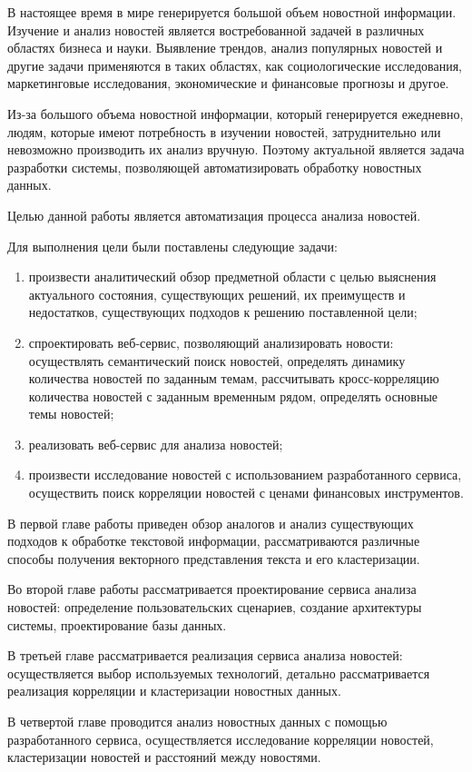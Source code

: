 \aftertitle

В настоящее время в мире генерируется большой объем новостной информации. Изучение и анализ новостей является востребованной задачей в различных областях бизнеса и науки. Выявление трендов, анализ популярных новостей и другие задачи применяются в таких областях, как социологические исследования, маркетинговые исследования, экономические и финансовые прогнозы и другое.

Из-за большого объема новостной информации, который генерируется ежедневно, людям, которые имеют потребность в изучении новостей, затруднительно или невозможно производить их анализ вручную. Поэтому актуальной является задача разработки системы, позволяющей автоматизировать обработку новостных данных.

Целью данной работы является автоматизация процесса анализа новостей.

Для выполнения цели были поставлены следующие задачи:
\begin{enumerate}
    \item произвести аналитический обзор предметной области с целью выяснения актуального состояния, существующих решений, их преимуществ и недостатков, существующих подходов к решению поставленной цели;
    \item спроектировать веб-сервис, позволяющий анализировать новости: осуществлять семантический поиск новостей, определять динамику количества новостей по заданным темам, рассчитывать кросс-корреляцию количества новостей с заданным временным рядом, определять основные темы новостей;
    \item реализовать веб-сервис для анализа новостей;
    \item произвести исследование новостей с использованием разработанного сервиса, осуществить поиск корреляции новостей с ценами финансовых инструментов.
\end{enumerate}

В первой главе работы приведен обзор аналогов и анализ существующих подходов к обработке текстовой информации, рассматриваются различные способы получения векторного представления текста и его кластеризации.

Во второй главе работы рассматривается проектирование сервиса анализа новостей: определение пользовательских сценариев, создание архитектуры системы, проектирование базы данных.

В третьей главе рассматривается реализация сервиса анализа новостей: осуществляется выбор используемых технологий, детально рассматривается реализация корреляции и кластеризации новостных данных.

В четвертой главе проводится анализ новостных данных с помощью разработанного сервиса, осуществляется исследование корреляции новостей, кластеризации новостей и расстояний между новостями.
